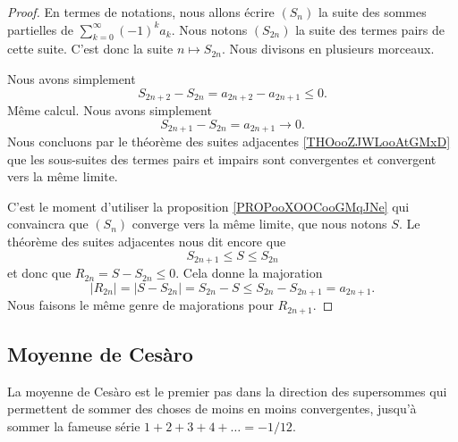 \begin{proof}
	En termes de notations, nous allons écrire \( (S_n)\) la suite des sommes partielles de \( \sum_{k=0}^{\infty}(-1)^ka_k\). Nous notons \( (S_{2n})\) la suite des termes pairs de cette suite. C'est donc la suite \( n\mapsto S_{2n}\).
	Nous divisons en plusieurs morceaux.
	\begin{subproof}
		Nous avons simplement
		\begin{equation}
			S_{2n+2}-S_{2n}=a_{2n+2}-a_{2n+1}\leq 0.
		\end{equation}
		Même calcul.
		 Nous avons simplement
		\begin{equation}
			S_{2n+1}-S_{2n}=a_{2n+1}\to 0.
		\end{equation}
		Nous concluons par le théorème des suites adjacentes \ref{THOooZJWLooAtGMxD} que les sous-suites des termes pairs et impairs sont convergentes et convergent vers la même limite.
	\end{subproof}
	C'est le moment d'utiliser la proposition \ref{PROPooXOOCooGMqJNe} qui convaincra  que \( (S_n)\) converge vers la même limite, que nous notons \( S\). Le théorème des suites adjacentes nous dit encore que
	\begin{equation}
		S_{2n+1}\leq S\leq S_{2n}
	\end{equation}
	et donc que \( R_{2n}=S-S_{2n}\leq 0\). Cela donne la majoration
	\begin{equation}
		| R_{2n} |=| S-S_{2n} |=S_{2n}-S\leq S_{2n}-S_{2n+1}=a_{2n+1}.
	\end{equation}
	Nous faisons le même genre de majorations pour \( R_{2n+1}\).
\end{proof}

\subsection{Moyenne de Cesàro}

La moyenne de Cesàro est le premier pas dans la direction des supersommes\cite{BIBooUCSPooNKNWEK} qui permettent de sommer des choses de moins en moins convergentes, jusqu'à sommer la fameuse série \( 1+2+3+4+\ldots=-1/12\).


